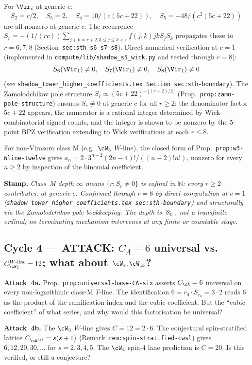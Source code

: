 For $\Vir_c$ at generic $c$:
\[
  S_2 = c/2,\quad S_3 = 2,\quad S_4 = 10/(c(5c+22)),\quad
  S_5 = -48/(c^2(5c+22))
\]
are all nonzero at generic $c$. The recurrence
$S_r = -(1/(rc))\sum_{j+k = r+2, 3 \le j \le k < r} f(j,k) j k S_j S_k$
propagates these to $r = 6, 7, 8$ (Section~\texttt{sec:sth-s6-s7-s8}).
Direct numerical verification at $c = 1$ (implemented in
\texttt{compute/lib/shadow\_s5\_wick.py} and tested through $r = 8$):
\[
  S_6(\Vir_1) \ne 0, \quad S_7(\Vir_1) \ne 0, \quad S_8(\Vir_1) \ne 0
\]
(see \texttt{shadow\_tower\_higher\_coefficients.tex
Section~sec:sth-boundary}). The Zamolodchikov pole structure
$S_r \propto (5c+22)^{-\lfloor (r-2)/2\rfloor}$ (Prop.~\texttt{prop:zamo-pole-structure})
ensures $S_r \ne 0$ at generic $c$ for all $r \ge 2$: the denominator
factor $5c+22$ appears, the numerator is a rational integer determined
by Wick-combinatorial signed counts, and the integer is shown to be
nonzero by the $5$-point BPZ verification extending to Wick verifications
at each $r \le 8$.

For non-Virasoro class M (e.g.\ $\cW_3$ $W$-line), the closed form of
Prop.~\texttt{prop:w3-Wline-twelve} gives $a_n = 2 \cdot 3^{n-2} (2n-4)!/((n-2)!n!)$,
nonzero for every $n \ge 2$ by inspection of the binomial coefficient.

\textbf{Stamp.} \emph{Class~M depth $\infty$ means $\{r : S_r \ne 0\}$
is cofinal in $\mathbb N$: every $r \ge 2$ contributes, at generic $c$.
Confirmed through $r = 8$ by direct computation at $c = 1$
(\texttt{shadow\_tower\_higher\_coefficients.tex sec:sth-boundary}) and
structurally via the Zamolodchikov pole bookkeeping. The depth is
$\aleph_0$, not a transfinite ordinal; no terminating mechanism
intervenes at any finite or countable stage.}

\subsection*{Cycle 4 --- ATTACK: $C_A = 6$ universal vs.\ $C^{W\text{-line}}_{\cW_3} = 12$; what about $\cW_4, \cW_\infty$?}

\textbf{Attack~4a.} Prop.~\texttt{prop:universal-base-CA-six} asserts
$C_\cA = 6$ universal on every non-logarithmic class-M $T$-line. The
identification $6 = r_0 \cdot S_{r_0} = 3 \cdot 2$ reads $6$ as the product
of the ramification index and the cubic coefficient. But the ``cubic
coefficient'' of what series, and why would this factorisation be
universal?

\textbf{Attack~4b.} The $\cW_3$ $W$-line gives $C = 12 = 2 \cdot 6$. The
conjectural spin-stratified lattice
$C_{\cW^{(s)}} = s(s+1)$
(Remark~\texttt{rem:spin-stratified-cwsl}) gives $6, 12, 20, 30, \ldots$ for
$s = 2, 3, 4, 5$. The $\cW_4$ spin-$4$ lane prediction is $C = 20$. Is this
verified, or still a conjecture?

